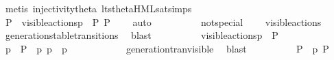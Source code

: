 \begin{isabellebody}
\ {\isacharparenleft}{\kern0pt}metis\ injectivity{\isacharunderscore}{\kern0pt}theta{\isacharparenleft}{\kern0pt}{}{\isacharparenright}{\kern0pt}\ lts{\isacharunderscore}{\kern0pt}theta{\isachardot}{\kern0pt}HML{\isacharunderscore}{\kern0pt}sat{\isachardot}{\kern0pt}simps{\isacharparenleft}{\kern0pt}{}{\isacharparenright}{\kern0pt}{\isacharparenright}{\kern0pt}\isanewline
\ \ \ \ \ \ \ \ \isamarkupfalse%
\ \isamarkupfalse%
\ P{\isacharprime}{\kern0pt}\ \ {\isacartoucheopen}{\isasymtheta}{\isacharbrackleft}{\kern0pt}visible{\isacharunderscore}{\kern0pt}actions{\isacharbrackright}{\kern0pt}{\isacharparenleft}{\kern0pt}p{\isacharparenright}{\kern0pt}\ {\isasymlongmapsto}\isactrlsup {\isasymtheta}{\isasymalpha}\ P{\isacharprime}{\kern0pt}{\isacartoucheclose}\ {\isacartoucheopen}P{\isacharprime}{\kern0pt}\ {\isasymTurnstile}\ {\isasymsigma}{\isacharparenleft}{\kern0pt}{\isasymphi}{\isacharparenright}{\kern0pt}{\isacartoucheclose}\ \isamarkupfalse%
\ auto\isanewline
\ \ \ \ \ \ \ \ \isamarkupfalse%
\ {\isasymalpha}{\isacharunderscore}{\kern0pt}not{\isacharunderscore}{\kern0pt}special\ \isamarkupfalse%
\ {\isacartoucheopen}{\isasymalpha}\ {\isasymin}\ visible{\isacharunderscore}{\kern0pt}actions{\isacartoucheclose}\ \isamarkupfalse%
\ generation{\isacharunderscore}{\kern0pt}stable{\isacharunderscore}{\kern0pt}transitions\ \isamarkupfalse%
\ blast\isanewline
\ \ \ \ \ \ \ \ \isamarkupfalse%
\ {\isacartoucheopen}{\isasymtheta}{\isacharbrackleft}{\kern0pt}visible{\isacharunderscore}{\kern0pt}actions{\isacharbrackright}{\kern0pt}{\isacharparenleft}{\kern0pt}p{\isacharparenright}{\kern0pt}\ {\isasymlongmapsto}\isactrlsup {\isasymtheta}{\isasymalpha}\ P{\isacharprime}{\kern0pt}{\isacartoucheclose}\ \isamarkupfalse%
\ p{\isacharprime}{\kern0pt}\ \ {\isacartoucheopen}P{\isacharprime}{\kern0pt}\ {\isacharequal}{\kern0pt}\ {\isasymtheta}{\isacharparenleft}{\kern0pt}p{\isacharprime}{\kern0pt}{\isacharparenright}{\kern0pt}{\isacartoucheclose}\ {\isacartoucheopen}p\ {\isasymlongmapsto}{\isasymalpha}\ p{\isacharprime}{\kern0pt}{\isacartoucheclose}\isanewline
\ \ \ \ \ \ \ \ \ \ \isamarkupfalse%
\ generation{\isacharunderscore}{\kern0pt}tran{\isacharunderscore}{\kern0pt}visible\ \isamarkupfalse%
\ blast\isanewline
\isanewline
\ \ \ \ \ \ \ \ \isamarkupfalse%
\ {\isacartoucheopen}P{\isacharprime}{\kern0pt}\ {\isacharequal}{\kern0pt}\ {\isasymtheta}{\isacharparenleft}{\kern0pt}p{\isacharprime}{\kern0pt}{\isacharparenright}{\kern0pt}{\isacartoucheclose}\ {\isacartoucheopen}P{\isacharprime}{\kern0pt}\ {\isasymTurnstile}\ {\isasymsigma}{\isacharparenleft}{\kern0pt}{\isasymphi}{\isacharparenright}{\kern0pt}{\isacartoucheclose}\ \isamarkupfalse%

\end{isabellebody}
